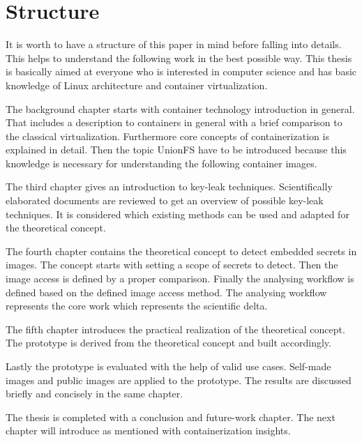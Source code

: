 %
%
\section{Structure}
\label{sec:intro:structure}
It is worth to have a structure of this paper in mind before falling into details. This helps to understand the following work in the best possible way. This thesis is basically aimed at everyone who is interested in computer science and has basic knowledge of Linux architecture and container virtualization.

The background chapter starts with container technology introduction in general. 
That includes a description to containers in general with a brief comparison to the classical virtualization. Furthermore core concepts of containerization is explained in detail.
Then the topic UnionFS have to be introduced because this knowledge is necessary for understanding the following container images.

The third chapter gives an introduction to key-leak techniques.
Scientifically elaborated documents are reviewed to get an overview of possible key-leak techniques.
It is considered which existing methods can be used and adapted for the theoretical concept.

The fourth chapter contains the theoretical concept to detect embedded secrets in images. The concept starts with setting a scope of secrets to detect. Then the image access is defined by a proper comparison.
Finally the analysing workflow is defined based on the defined image access method.
The analysing workflow represents the core work which represents the scientific delta.

The fifth chapter introduces the practical realization of the theoretical concept. The prototype is derived from the theoretical concept and built accordingly.

Lastly the prototype is evaluated with the help of valid use cases. Self-made images and public images are applied to the prototype. The results are discussed briefly and concisely in the same chapter.

The thesis is completed with a conclusion and future-work chapter.	
The next chapter will introduce as mentioned with containerization insights.
